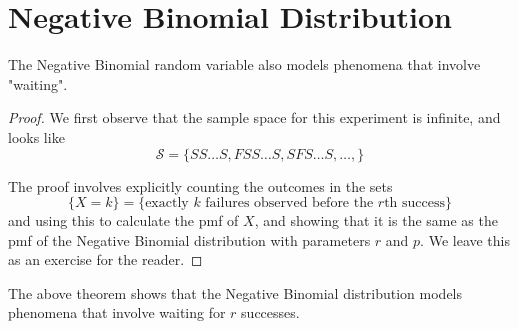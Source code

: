 \section{Negative Binomial Distribution}
The Negative Binomial random variable also models phenomena that involve "waiting". 





\begin{proof}
We first observe that the sample space for this experiment is infinite, and looks like
$$ \mathcal{S} = \{SS\dots S, FSS\dots S, SFS\dots S, \dots , \}$$

The proof involves explicitly counting the outcomes in the sets 
$$\{X = k\} = \{\text{exactly $k$ failures observed before the $r$th success}\}$$ 
and using this to calculate the pmf of $X$, and showing that it is the same as the pmf of the Negative Binomial distribution with parameters $r$ and $p$. We leave this as an exercise for the reader. 
\end{proof}
The above theorem shows that the Negative Binomial distribution models phenomena that involve waiting for $r$ successes. 





